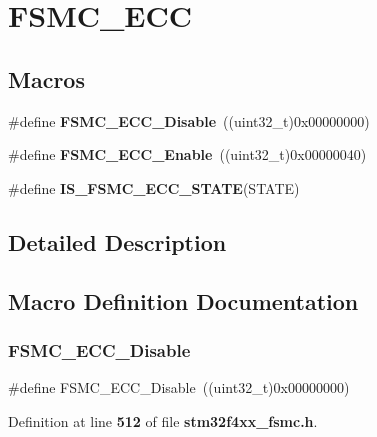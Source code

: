 \section{F\+S\+M\+C\+\_\+\+E\+CC}
\label{group__FSMC__ECC}
\subsection*{Macros}
\begin{DoxyCompactItemize}
\item 
\#define \textbf{ F\+S\+M\+C\+\_\+\+E\+C\+C\+\_\+\+Disable}~((uint32\+\_\+t)0x00000000)
\item 
\#define \textbf{ F\+S\+M\+C\+\_\+\+E\+C\+C\+\_\+\+Enable}~((uint32\+\_\+t)0x00000040)
\item 
\#define \textbf{ I\+S\+\_\+\+F\+S\+M\+C\+\_\+\+E\+C\+C\+\_\+\+S\+T\+A\+TE}(S\+T\+A\+TE)
\end{DoxyCompactItemize}


\subsection{Detailed Description}


\subsection{Macro Definition Documentation}
\mbox{\label{group__FSMC__ECC_ga9a3264c0718f5023fd106abea7ef806d}} 
\subsubsection{F\+S\+M\+C\+\_\+\+E\+C\+C\+\_\+\+Disable}
{\footnotesize\ttfamily \#define F\+S\+M\+C\+\_\+\+E\+C\+C\+\_\+\+Disable~((uint32\+\_\+t)0x00000000)}



Definition at line \textbf{ 512} of file \textbf{ stm32f4xx\+\_\+fsmc.\+h}.

\mbox{\label{group__FSMC__ECC_ga9d940243830695412d4c98228bb5b763}} 
